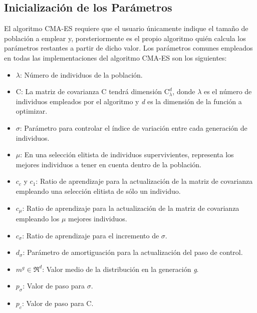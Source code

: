 \bigskip

\subsection{Inicialización de los Parámetros}

El algoritmo CMA-ES requiere que el usuario únicamente indique el tamaño de población a emplear y, porsteriormente es el propio algoritmo quién calcula los parámetros restantes a partir de dicho valor. Los parámetros comunes empleados en todas las implementaciones del algoritmo CMA-ES son los siguientes: 

\begin{itemize}
\item $\lambda$: Número de individuos de la población.
\item C: La matriz de covarianza C tendrá dimensión $\textrm{C}_{\lambda}^{d}$, donde $\lambda$ es el número de individuos empleados por el algoritmo y \textit{d} es la dimensión de la función a optimizar.
\item $\sigma$: Parámetro para controlar el índice de variación entre cada generación de individuos.
\item $\mu$: En una selección elitista de individuos supervivientes, representa los mejores individuos a tener en cuenta dentro de la población.
\item $c_{c}$ y $c_{1}$: Ratio de aprendizaje para la actualización de la matriz de covarianza empleando una selección elitista de sólo un individuo.
\item $c_{\mu}$: Ratio de aprendizaje para la actualización de la matriz de covarianza empleando los $\mu$ mejores individuos.
\item $c_{\sigma}$: Ratio de aprendizaje para el incremento de $\sigma$.
\item $d_{\sigma}$: Parámetro de amortiguación para la actualización del paso de control.
\item $m^{g} \in \Re^{d}$: Valor medio de la distribución en la generación \textit{g}.
\item $p_{\sigma}$: Valor de paso para $\sigma$.
\item $p_{c}$: Valor de paso para C.
\end{itemize}

